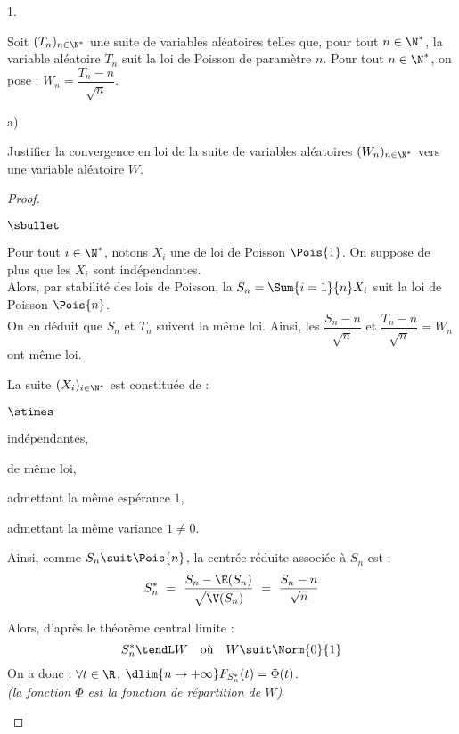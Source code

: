 \documentclass[11pt]{article}%
\begin{document}
\begin{noliste}{1.}
\item Soit $(T_n)_{n \in \N^*}$ une suite de variables aléatoires
  telles que, pour tout $n \in \N^*$, la variable aléatoire $T_n$ suit
  la loi de Poisson de paramètre $n$. Pour tout $n \in \N^*$, on pose
  : $W_n = \dfrac{T_n - n}{\sqrt{n}}$.
  \begin{noliste}{a)}
    \setlength{\itemsep}{2mm}
  \item Justifier la convergence en loi de la suite de variables
    aléatoires $(W_n)_{n \in \N^*}$ vers une variable aléatoire $W$.
    \begin{proof}~
      \begin{noliste}{$\sbullet$}
      \item Pour tout $i \in \N^*$, notons $X_i$ une \var de loi de Poisson
        $\Pois{1}$. On suppose de plus que les \var $X_i$ sont indépendantes.\\
        Alors, par stabilité des lois de Poisson, la \var $S_n =
        \Sum{i=1}{n} X_i$ suit la loi de Poisson $\Pois{n}$.\\
        On en déduit que $S_n$ et $T_n$ suivent la même loi. Ainsi,
        les \var $\dfrac{S_n -n}{\sqrt{n}}$ et $\dfrac{T_n
          -n}{\sqrt{n}}=W_n$ ont même loi.
        
      \item La suite $(X_i)_{i \in \N^*}$ est constituée de \var :
        \begin{noliste}{$\stimes$}
        \item indépendantes,
          
        \item de même loi,
          
        \item admettant la même espérance $1$,
          
        \item admettant la même variance $1 \neq 0$.
        \end{noliste}
        Ainsi, comme $S_n \suit \Pois{n}$, la \var centrée réduite
        associée à $S_n$ est :
        \[
          S_n^* \ = \ \dfrac{S_n - \E(S_n)}{\sqrt{\V(S_n)}} \ = \
          \dfrac{S_n - n}{\sqrt{n}}
        \]
        
      \item Alors, d'après le théorème central limite :
        \[
          S_n^* \tendL W \quad \text{où} \quad W \suit \Norm{0}{1}
        \]
        On a donc : $\forall t \in \R$, $\dlim{n\to +\infty}
        F_{S_n^*}(t) = \Phi(t)$.\\
        {\it (la fonction $\Phi$ est la fonction de répartition de
          $W$)}
        

\end{noliste}
\end{proof}
\end{noliste}
\end{noliste}
\end{document}

